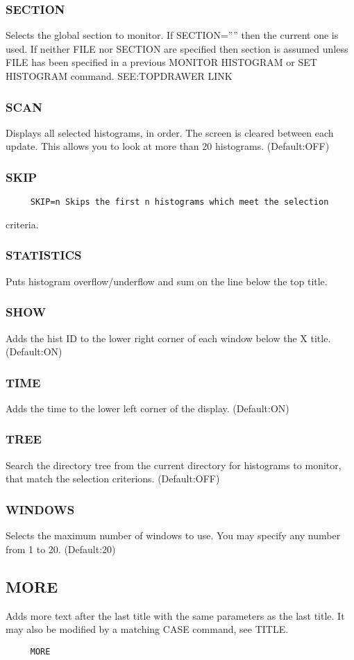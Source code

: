 \subsubsection{SECTION}
Selects the global section to monitor.  If SECTION='''' then the current
one is used.  If neither FILE nor SECTION are specified then section is
assumed unless FILE has been specified in a previous MONITOR HISTOGRAM
or SET HISTOGRAM command.  SEE:TOPDRAWER LINK 
\subsubsection{SCAN}
Displays all selected histograms, in order.  The screen is cleared
between each update.  This allows you to look at more than 20
histograms.  
(Default:OFF) 
\subsubsection{SKIP}
\begin{verbatim}
     SKIP=n Skips the first n histograms which meet the selection
\end{verbatim}
criteria.  
\subsubsection{STATISTICS}
Puts histogram overflow/underflow and sum on the line below the top
title.  
\subsubsection{SHOW}
Adds the hist ID to the lower right corner of each window below the X
title.  
(Default:ON) 
\subsubsection{TIME}
Adds the time to the lower left corner of the display.  
(Default:ON) 
\subsubsection{TREE}
Search the directory tree from the current directory for histograms to
monitor, that match the selection criterions.  
(Default:OFF) 
\subsubsection{WINDOWS}
Selects the maximum number of windows to use.  You may specify any
number from 1 to 20.  
(Default:20) 
\subsection{MORE}
Adds more text after the last title with the same parameters as the last
title.  It may also be modified by a matching CASE command, see TITLE.  
\begin{verbatim}
     MORE 
\end{verbatim}
